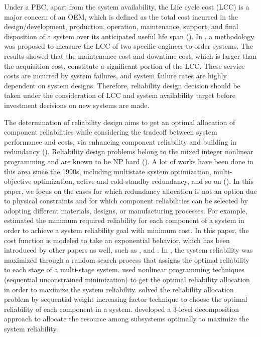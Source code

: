 \documentclass[preprint,12pt]{elsarticle}
\begin{document}
Under a PBC, apart from the system availability, the Life cycle cost (LCC) is a major concern of an OEM, which is defined as the total cost  incurred in the design/development, production, operation, maintenance, support, and final disposition of a system over its anticipated useful life span (\citet{Barringer}). In \citet{Oner2007}, a methodology was proposed to measure the LCC of two specific engineer-to-order systems. The results showed that the maintenance cost and downtime cost, which is larger than the acquisition cost, constitute a significant portion of the LCC. These service costs are incurred by system failures, and system failure rates are highly dependent on system designs. Therefore, reliability design decision should be taken under the consideration of LCC and system availability target before investment decisions on new systems are made.
%

The determination of reliability design aims to get an optimal allocation of component reliabilities while considering the tradeoff between system performance and costs, via enhancing component reliability and building in redundancy (\citet{Kuo}). Reliability design problems belong to the mixed integer nonlinear programming and are known to be NP hard (\citet{Chern}). A lot of works have been done in this area since the 1990s, including multistate system optimization, multi-objective optimization, active and cold-standby redundancy, and so on (\citet{Kuo}). In this paper, we focus on the cases for which redundancy allocation is not an option due to physical constraints and for which component reliabilities can be selected by adopting different materials, designs, or manufacturing processes. For example, \citet{Mettas} estimated the minimum required reliability for each component of a system in order to achieve a system reliability goal with minimum cost. In this paper, the cost function is modeled to take an exponential behavior, which has been introduced by other papers as well, such as \citet{Huang}, \citet{Oner2010} and \citet{Jin}. In \citet{Beraha}, the system reliability was maximized through a random search process that assigns the optimal reliability to each stage of a multi-stage system. \citet{Hwang} used nonlinear programming techniques (sequential unconstrained minimization) to get the optimal reliability allocation in order to maximize the system reliability. \citet{Sheela} solved the reliability allocation problem by sequential weight increasing factor technique to choose the optimal reliability of each component in a system. \citet{Li} developed a 3-level decomposition approach to allocate the resource among subsystems optimally to maximize the system reliability.
\end{document}
